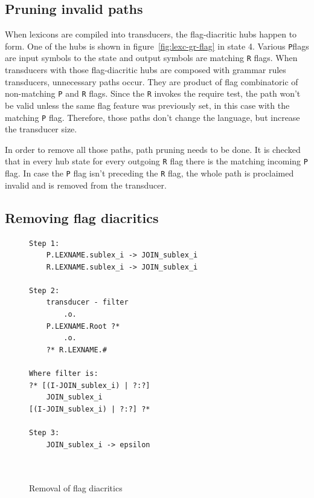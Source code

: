\documentclass[10pt, a4paper]{article}
\begin{document}
\subsection{Pruning invalid paths}

When lexicons are compiled into transducers, the flag-diacritic hubs happen to form. One of the hubs is shown in
figure~\ref{fig:lexc-gr-flag} in state 4. Various \verb+P+flags are input symbols to the state and output symbols are matching \verb+R+ flags. 
When transducers with those flag-diacritic hubs are composed with grammar rules transducers, unnecessary paths occur. 
They are product of flag combinatoric of non-matching \verb+P+ and \verb+R+ flags. Since the \verb+R+ invokes the require test, 
the path won't be valid unless the same flag feature was previously set, in this case with the matching \verb+P+ flag. 
Therefore, those paths don't change the language, but increase the transducer size.

In order to remove all those paths, path pruning needs to be done. It is checked that in every hub state for every outgoing 
\verb+R+ flag there is the matching incoming \verb+P+ flag. In case the \verb+P+ flag isn't preceding the \verb+R+ flag, 
the whole path is proclaimed invalid and is removed from the transducer.





		

\subsection{Removing flag diacritics}


\begin{figure}
\centering
\begin{verbatim}
Step 1:
    P.LEXNAME.sublex_i -> JOIN_sublex_i
    R.LEXNAME.sublex_i -> JOIN_sublex_i
    
Step 2:
    transducer - filter
        .o.
    P.LEXNAME.Root ?*
        .o.
    ?* R.LEXNAME.#
  
Where filter is:
?* [(I-JOIN_sublex_i) | ?:?]
    JOIN_sublex_i 
[(I-JOIN_sublex_i) | ?:?] ?*

Step 3:
    JOIN_sublex_i -> epsilon

  
    \end{verbatim}
    \caption{Removal of flag diacritics
    \label{fig:lexc-remov}}
\end{figure}
\end{document}
